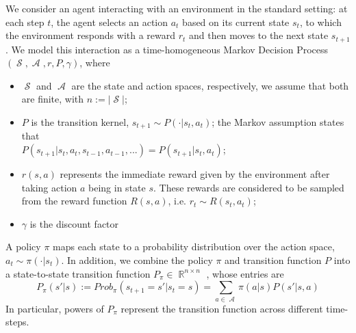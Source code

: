 \documentclass[12pt,a4paper,openright,twoside]{article}
\DeclareMathOperator*{\R}{\mathbb{R}}
\DeclareMathOperator*{\Sspace}{\mathcal{S}}
\DeclareMathOperator*{\A}{\mathcal{A}}
\numberwithin{equation}{section}
\theoremstyle{definition}
\theoremstyle{remark}
\theoremstyle{plain}
\begin{document}
We consider an agent interacting with an environment in the standard setting\cite{rlformulation}: at each step $t$, the agent selects an action $a_t$ based on its current state $s_t$, to which the environment responds with a reward $r_t$ and then moves to the next state $s_{t+1}$. We model this interaction as a time-homogeneous Markov Decision Process $(\Sspace, \A, r, P, \gamma)$, where
\begin{itemize}
    \item $\Sspace$ and $\A$ are the state and action spaces, respectively, we assume that both are finite, with $n:=|\Sspace|$;
    \item $P$ is the transition kernel, $s_{t+1} \sim P(\cdot | s_t,a_t)$; the Markov assumption states that \\ $P(s_{t+1} | s_t, a_t, s_{t-1}, a_{t-1}, ...) = P(s_{t+1} | s_t, a_t)$;
    \item $r(s,a)$ represents the immediate reward given by the environment after taking action $a$ being in state $s$. These rewards are considered to be sampled from the reward function $R(s,a)$, i.e. $r_t \sim R(s_t,a_t)$;
    \item $\gamma$ is the discount factor
\end{itemize}
A policy $\pi$ maps each state to a probability distribution over the action space, $a_t \sim \pi(\cdot | s_t)$. In addition, we combine the policy $\pi$ and transition function $P$ into a state-to-state transition function $P_\pi \in \R^{n \times n}$ , whose entries are
\begin{equation} \label{transitionFunction}
    P_{\pi} (s'|s) := Prob_\pi (s_{t+1}=s' | s_t = s) = \sum_{a\in\A} \pi(a|s)P(s'|s,a)
\end{equation}
In particular, powers of $P_\pi$ represent the transition function across different time-steps.
\end{document}
